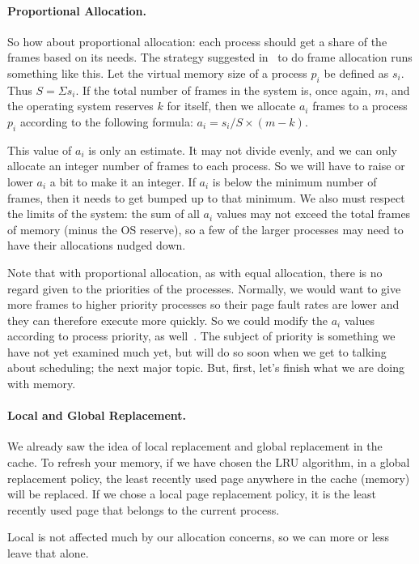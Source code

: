 \paragraph{Proportional Allocation.} So how about proportional allocation: each process should get a share of the frames based on its needs. The strategy suggested in~\cite{osc} to do frame allocation runs something like this. Let the virtual memory size of a process $p_{i}$ be defined as $s_{i}$. Thus $S = \Sigma s_{i}$. If the total number of frames in the system is, once again, $m$, and the operating system reserves $k$ for itself, then we allocate $a_{i}$ frames to a process $p_{i}$ according to the following formula: $a_{i} = s_{i} / S \times (m - k)$.

This value of $a_{i}$ is only an estimate. It may not divide evenly, and we can only allocate an integer number of frames to each process.  So we will have to raise or lower $a_{i}$ a bit to make it an integer. If $a_{i}$ is below the minimum number of frames, then it needs to get bumped up to that minimum. We also must respect the limits of the system: the sum of all $a_{i}$ values may not exceed the total frames of memory (minus the OS reserve), so a few of the larger processes may need to have their allocations nudged down.

Note that with proportional allocation, as with equal allocation, there is no regard given to the priorities of the processes. Normally, we would want to give more frames to higher priority processes so their page fault rates are lower and they can therefore execute more quickly. So we could modify the $a_{i}$ values according to process priority, as well~\cite{osc}. The subject of priority is something we have not yet examined much yet, but will do so soon when we get to talking about scheduling; the next major topic. But, first, let's finish what we are doing with memory.

\paragraph{Local and Global Replacement.}
We already saw the idea of local replacement and global replacement in the cache. To refresh your memory, if we have chosen the LRU algorithm, in a global replacement policy, the least recently used page anywhere in the cache (memory) will be replaced. If we chose a local page replacement policy, it is the least recently used page that belongs to the current process.

Local is not affected much by our allocation concerns, so we can more or less leave that alone. 

